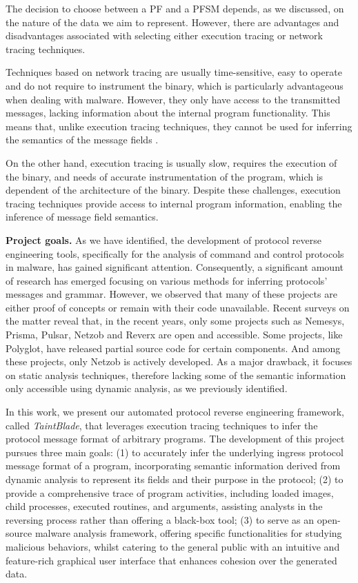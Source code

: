 \documentclass[conference]{IEEEtran}
\begin{document}
The decision to choose between a PF and a PFSM depends, as we discussed, on the
nature of the data we aim to represent. However, there are advantages and
disadvantages associated with selecting either execution tracing or network
tracing techniques.

Techniques based on network tracing are usually time-sensitive, easy to operate
and do not require to instrument the binary, which is particularly advantageous
when dealing with malware. However, they only have access to the transmitted
messages, lacking information about the internal program functionality. This means that,
unlike execution tracing techniques, they cannot be used for inferring the
semantics of the message fields \cite{apre_survey}.

On the other hand, execution tracing is usually slow, requires the execution of
the binary, and needs of accurate instrumentation of the program, which is
dependent of the architecture of the binary. Despite these challenges,
execution tracing techniques provide access to internal program information,
enabling the inference of message field semantics.

\textbf{Project goals.}
As we have identified, the development of
protocol reverse engineering tools, specifically for the analysis of command and control protocols in malware, has gained significant attention.
Consequently, a significant amount of research has emerged focusing on various methods for inferring protocols' messages and grammar.
However, we observed that many of these projects are either proof of concepts
or remain with their code unavailable. Recent
surveys on the matter\cite{apre_survey}\cite{apre_survey2} reveal that, in the recent years, only some projects such as Nemesys\cite{github_pre_nemesys}, Prisma\cite{github_pre_prisam}, Pulsar\cite{github_pre_pulsar},
Netzob\cite{github_pre_netzob} and Reverx\cite{github_pre_reverx} are open and accessible.
Some projects, like Polyglot\cite{polyglot_caballero}, have released partial source code for certain components.
And among these projects, only Netzob is actively developed. As a major drawback, it focuses on static analysis techniques, therefore lacking some of the semantic information
only accessible using dynamic analysis, as we previously identified.

In this work, we present our automated protocol reverse engineering framework,
called \textit{TaintBlade}, that leverages execution tracing techniques to
infer the protocol message format of arbitrary programs. The development of
this project pursues three main goals: (1) to accurately infer the underlying
ingress protocol message format of a program, incorporating semantic
information derived from dynamic analysis to represent its fields and their purpose
in the protocol; (2) to provide a comprehensive trace of program activities, including
loaded images, child processes, executed routines, and arguments, assisting
analysts in the reversing process rather than offering a black-box tool; (3) to
serve as an open-source malware analysis framework, offering specific
functionalities for studying malicious behaviors, whilst catering to the
general public with an intuitive and feature-rich graphical user interface that
enhances cohesion over the generated data.
\end{document}

